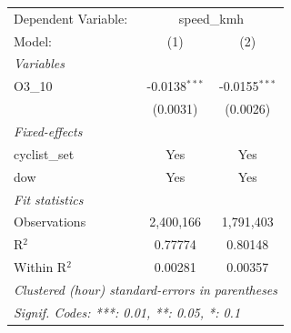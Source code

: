 \begingroup
\centering
\begin{tabular}{lcc}
   \tabularnewline \midrule \midrule
   Dependent Variable: & \multicolumn{2}{c}{speed\_kmh}\\
   Model:        & (1)             & (2)\\  
   \midrule
   \emph{Variables}\\
   O3\_10        & -0.0138$^{***}$ & -0.0155$^{***}$\\   
                 & (0.0031)        & (0.0026)\\   
   \midrule
   \emph{Fixed-effects}\\
   cyclist\_set  & Yes             & Yes\\  
   dow           & Yes             & Yes\\  
   \midrule
   \emph{Fit statistics}\\
   Observations  & 2,400,166       & 1,791,403\\  
   R$^2$         & 0.77774         & 0.80148\\  
   Within R$^2$  & 0.00281         & 0.00357\\  
   \midrule \midrule
   \multicolumn{3}{l}{\emph{Clustered (hour) standard-errors in parentheses}}\\
   \multicolumn{3}{l}{\emph{Signif. Codes: ***: 0.01, **: 0.05, *: 0.1}}\\
\end{tabular}
\par\endgroup
